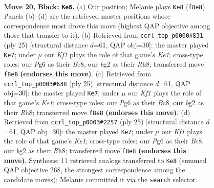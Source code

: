 \documentclass[11pt]{article}
\begin{document}
\clearpage

\begin{figure}[p]\centering
\begin{subfigure}{0.46\textwidth}\centering
\resizebox{\linewidth}{!}{%
\newchessgame
\chessboard[
  setfen={rn1r1knb/p4p1p/P1p3p1/4p3/4P2P/5P2/2P1N1B1/R1B2RK1 b - - 2 20},
  showmover=false,
  pgfstyle=straightmove, color=movearrow, markmove={f8-e8}
]}
\caption{}
\end{subfigure}\hfill
\begin{subfigure}{0.46\textwidth}\centering
\resizebox{\linewidth}{!}{%
\newchessgame
\chessboard[
  setfen={r1b1k2r/pp1n1ppp/4p3/3pP3/3N1P2/8/PPP3PP/R3KB1R b KQkq - 0 13},
  showmover=false,
  pgfstyle=straightmove, color=movearrow, markmove={e8-e7}
]}
\caption{}
\end{subfigure}
\\[4pt]
\begin{subfigure}{0.46\textwidth}\centering
\resizebox{\linewidth}{!}{%
\newchessgame
\chessboard[
  setfen={r1b1k2r/pp1n1ppp/4p3/3pP3/3N1P2/8/PPP3PP/R3KB1R b KQkq - 0 13},
  showmover=false,
  pgfstyle=straightmove, color=movearrow, markmove={e8-e7}
]}
\caption{}
\end{subfigure}\hfill
\begin{subfigure}{0.46\textwidth}\centering
\resizebox{\linewidth}{!}{%
\newchessgame
\chessboard[
  setfen={r1b1k2r/pp1n1ppp/4p3/3pP3/3N1P2/8/PPP3PP/R3KB1R b KQkq - 0 13},
  showmover=false,
  pgfstyle=straightmove, color=movearrow, markmove={e8-e7}
]}
\caption{}
\end{subfigure}
\caption{\textbf{Move 20, Black: \texttt{Ke8}.} (a) Our position; Melanie plays \texttt{Ke8} (\texttt{f8e8}). Panels (b)--(d) are the retrieved master positions whose correspondence most drove this move (highest QAP objective among those that transfer to it). (b) Retrieved from \texttt{ccrl\_top\_p0000\#831} (ply 25) [structural distance $d$=61, QAP obj=30]: the master played \texttt{Ke7}; under $\mu$ our \emph{Kf1} plays the role of that game's \emph{Ke1}; cross-type roles: our \emph{P}g6 as their \emph{B}c8, our \emph{b}g2 as their \emph{R}h8; transferred move \texttt{f8e8} \textbf{(endorses this move)}. (c) Retrieved from \texttt{ccrl\_top\_p0003\#638} (ply 25) [structural distance $d$=61, QAP obj=30]: the master played \texttt{Ke7}; under $\mu$ our \emph{Kf1} plays the role of that game's \emph{Ke1}; cross-type roles: our \emph{P}g6 as their \emph{B}c8, our \emph{b}g2 as their \emph{R}h8; transferred move \texttt{f8e8} \textbf{(endorses this move)}. (d) Retrieved from \texttt{ccrl\_top\_p0003\#2257} (ply 25) [structural distance $d$=61, QAP obj=30]: the master played \texttt{Ke7}; under $\mu$ our \emph{Kf1} plays the role of that game's \emph{Ke1}; cross-type roles: our \emph{P}g6 as their \emph{B}c8, our \emph{b}g2 as their \emph{R}h8; transferred move \texttt{f8e8} \textbf{(endorses this move)}. Synthesis: 11 retrieved analogs transferred to \texttt{Ke8} (summed QAP objective 268, the strongest correspondence among the candidate moves); Melanie committed it via the \texttt{search} selector.}
\label{fig:thought-m39}
\end{figure}
\end{document}
